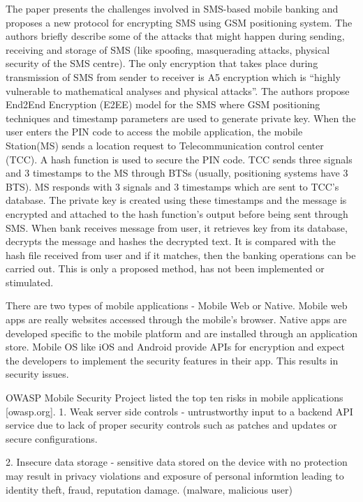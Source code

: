 \documentclass{mproj}
\begin{document}
The paper presents the challenges involved in SMS-based mobile banking and proposes a new protocol for encrypting SMS using GSM positioning system. The authors briefly describe some of the attacks that might happen during sending, receiving and storage of SMS (like spoofing, masquerading attacks, physical security of the SMS centre). The only encryption that takes place during transmission of SMS from sender to receiver is A5 encryption which is “highly vulnerable to mathematical analyses and physical attacks”. The authors propose End2End Encryption (E2EE) model for the SMS where GSM positioning techniques and timestamp parameters are used to generate private key. When the user enters the PIN code to access the mobile application, the mobile Station(MS) sends a location request to Telecommunication control center (TCC). A hash function is used to secure the PIN code. TCC sends three signals and 3 timestamps to the MS through BTSs (usually, positioning systems have 3 BTS). MS responds with 3 signals and 3 timestamps which are sent to TCC’s database. The private key is created using these timestamps and the message is encrypted and attached to the hash function’s output before being sent through SMS. When bank receives message from user, it retrieves key from its database, decrypts the message and hashes the decrypted text. It is compared with the hash file received from user and if it matches, then the banking operations can be carried out. This is only a proposed method, has not been implemented or stimulated.



There are two types of mobile applications - Mobile Web or Native. Mobile web apps are really websites accessed through the mobile's browser. Native apps are developed specific to the mobile platform and are installed through an application store. Mobile OS like iOS and Android provide APIs for encryption and expect the developers to implement the security features in their app. This results in security issues.

OWASP Mobile Security Project listed the top ten risks in mobile applications [owasp.org].
1. Weak server side controls - untrustworthy input to a backend API service due to lack of proper security controls such as patches and updates or secure configurations.

2. Insecure data storage - sensitive data stored on the device with no protection may result in privacy violations and exposure of personal informtion leading to identity theft, fraud, reputation damage. (malware, malicious user)
\end{document}
